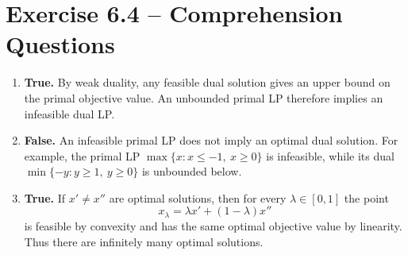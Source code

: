 \documentclass{Group_Templ}
\begin{document}
	\section*{Exercise 6.4 -- Comprehension Questions}
	\begin{enumerate}
		\item \textbf{True.} By weak duality, any feasible dual solution gives an upper bound on the primal objective value. An unbounded primal LP therefore implies an infeasible dual LP.
		
		\item \textbf{False.} An infeasible primal LP does not imply an optimal dual solution. For example, the primal LP $\max\{x : x\le -1,\ x\ge 0\}$ is infeasible, while its dual $\min\{-y : y\ge 1,\ y\ge 0\}$ is unbounded below.
		
		\item \textbf{True.} If $x'\ne x''$ are optimal solutions, then for every $\lambda\in[0,1]$ the point
		\[
		x_\lambda=\lambda x'+(1-\lambda)x''
		\]
		is feasible by convexity and has the same optimal objective value by linearity. Thus there are infinitely many optimal solutions.
	\end{enumerate}
	
\end{document}
